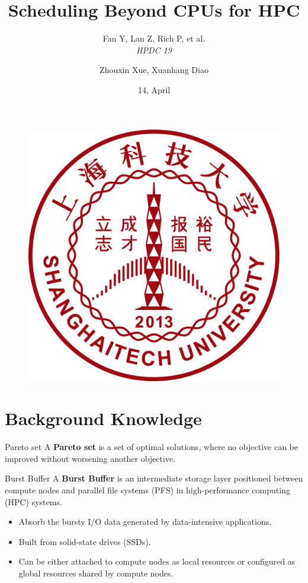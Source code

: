 \documentclass[aspectratio=1610]{beamer}
\author{Zhouxin Xue, Xuanhang Diao}
\title{Scheduling Beyond CPUs for HPC}
\subtitle{Fan Y, Lan Z, Rich P, et al. \\
\textit{HPDC 19} 
}
\institute{
    School of Biomedical Engineering, \\
    ShanghaiTech University \\
}
\date{14, April}
\begin{document}
\begin{frame}
    \titlepage
    \begin{figure}[htpb]
        \begin{center}
            \includegraphics[keepaspectratio, scale=0.2]{pic/ShanghaiTech_Logo.png}
        \end{center}
    \end{figure}
\end{frame}

\section{Background Knowledge}

\begin{frame}{Pareto set}
    A \textbf{Pareto set} is a set of optimal solutions, where no objective can be improved without worsening another objective.
\end{frame}

\begin{frame}{Burst Buffer}
    A \textbf{Burst Buffer} is an intermediate storage layer positioned between compute nodes and parallel file systems (PFS) in high-performance computing (HPC) systems. 
    \begin{itemize}
        \item Absorb the bursty I/O data generated by data-intensive applications.
        \item Built from solid-state drives (SSDs).
        \item Can be either attached to compute nodes as local resources or configured as global resources shared by compute nodes.
    \end{itemize}
\end{frame}
\end{document}
